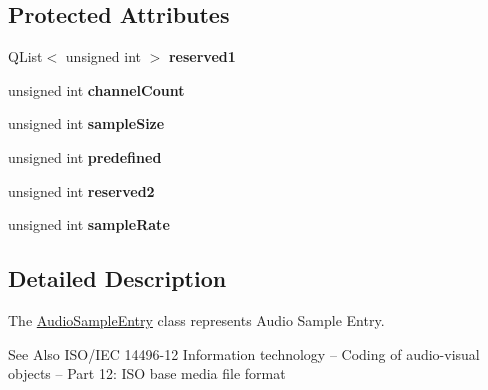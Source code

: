 \subsection*{Protected Attributes}
\begin{DoxyCompactItemize}
\item 
\hypertarget{class_audio_sample_entry_a8b91f9f7b55402cd83f88273de2567ce}{Q\-List$<$ unsigned int $>$ {\bfseries reserved1}}\label{class_audio_sample_entry_a8b91f9f7b55402cd83f88273de2567ce}

\item 
\hypertarget{class_audio_sample_entry_a510fb3f3a7bddfeec97cf665b092a7aa}{unsigned int {\bfseries channel\-Count}}\label{class_audio_sample_entry_a510fb3f3a7bddfeec97cf665b092a7aa}

\item 
\hypertarget{class_audio_sample_entry_aa550be0dc8fff32337a6b5715bbaf9e3}{unsigned int {\bfseries sample\-Size}}\label{class_audio_sample_entry_aa550be0dc8fff32337a6b5715bbaf9e3}

\item 
\hypertarget{class_audio_sample_entry_af6f8cbf557585cee84092456e010e8f9}{unsigned int {\bfseries predefined}}\label{class_audio_sample_entry_af6f8cbf557585cee84092456e010e8f9}

\item 
\hypertarget{class_audio_sample_entry_a7f96df3a386316d25ee27c151958ee6b}{unsigned int {\bfseries reserved2}}\label{class_audio_sample_entry_a7f96df3a386316d25ee27c151958ee6b}

\item 
\hypertarget{class_audio_sample_entry_a5e2e0e075a53502e9b9ed0a60025fdba}{unsigned int {\bfseries sample\-Rate}}\label{class_audio_sample_entry_a5e2e0e075a53502e9b9ed0a60025fdba}

\end{DoxyCompactItemize}


\subsection{Detailed Description}
The \hyperlink{class_audio_sample_entry}{Audio\-Sample\-Entry} class represents Audio Sample Entry. 

\begin{DoxySeeAlso}{See Also}
I\-S\-O/\-I\-E\-C 14496-\/12 Information technology – Coding of audio-\/visual objects – Part 12\-: I\-S\-O base media file format 
\end{DoxySeeAlso}


